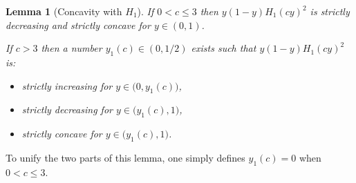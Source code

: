 \documentclass[12pt,reqno]{amsart}
\newtheorem{lemma}[lemma]{Lemma}
\theoremstyle{definition}
\newcommand{\ho}{H_1}
\begin{document}
%
%
\begin{lemma}[Concavity with $\ho$]\label{concavityH1} If $0 < c \leq 3$ then $y(1-y)\ho(cy)^2$ is strictly decreasing and strictly concave for $y \in (0,1)$.

If $c>3$ then a number $y_1(c) \in (0,1/2)$ exists such that $y(1-y)\ho(cy)^2$ is:
%
\begin{itemize}
\item strictly increasing for $y \in \big(0, y_1(c)\big)$, 
\item strictly decreasing for $y \in \big(y_1(c),1\big)$, 
\item strictly concave for $y \in \big(y_1(c),1\big)$. 
\end{itemize}
%
\end{lemma}
%
To unify the two parts of this lemma, one simply defines $y_1(c)=0$ when $0 < c \leq 3$. 
%
\end{document}
